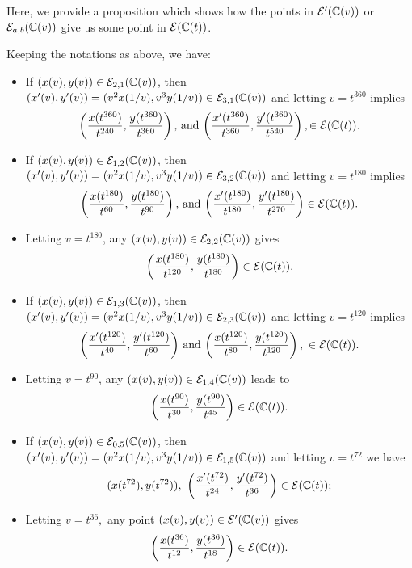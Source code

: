 \documentclass[11pt]{amsart}
\begin{document}
Here, we provide  a proposition which shows how the points  in ${\mathcal E}'({\mathbb C}(v))$ or ${\mathcal E}_{a, b}({\mathbb C}(v))$ give us some  point in ${\mathcal E} ({\mathbb C}(t))$. 
\begin{prop}
	\label{p1}
	Keeping the notations as above, we have:
	\begin{itemize}	
		\item [(1)] If $(x(v), y(v)) \in {\mathcal E}_{2, 1} ({\mathbb C}(v))$, then $ (x'(v), y'(v))=(v^2 x(1/v), v^3 y(1/v)) \in {\mathcal E}_{3, 1} ({\mathbb C}(v))$ and letting $v=t^{360}$ implies
		$$ \left(  \frac{x(t^{360})}{t^{240}},  \frac{y(t^{360})}{t^{360}}\right),\, \text{and}\,  
\left( \frac{x'(t^{360})}{t^{360}}, \frac{y'(t^{360})}{t^{540}} \right),
		\in {\mathcal E} ({\mathbb C}(t)).$$
		\item [(2)]  
		If $(x(v), y(v)) \in {\mathcal E}_{1, 2} ({\mathbb C}(v))$, then 
		$ (x'(v),y'(v))=(v^2 x(1/v), v^3 y(1/v)) \in {\mathcal E}_{3, 2} ({\mathbb C}(v))$ and letting $v=t^{180}$ implies  
		$$ 
		\left( \frac{x(t^{180})}{ t^{60}},  \frac{y(t^{180})}{t^{90}}\right), \, \text{and}\, 
		\left( \frac{x'(t^{180})}{ t^{180}}, \frac{y'(t^{180})}{t^{270}}\right) \in 
		{\mathcal E} ({\mathbb C}(t)).$$
	
	\item[(3)]	Letting $v=t^{180}$, any $(x(v), y(v)) \in {\mathcal E}_{2, 2} ({\mathbb C}(v))$ gives  
	$$\left(   \frac{x(t^{180})}{t^{120}},  \frac{y(t^{180})}{t^{180}}\right)  \in {\mathcal E} ({\mathbb C}(t)).$$
	
		\item [(4)] If $(x(v), y(v)) \in {\mathcal E}_{1, 3} ({\mathbb C}(v))$, then  
		$(x'(v),y'(v))=(v^2 x(1/v), v^3 y(1/v)) \in {\mathcal E}_{2, 3} ({\mathbb C}(v))$ and letting $v=t^{120}$ implies
		$$\left(  \frac{x'(t^{120})}{t^{40}} ,  \frac{y'(t^{120})}{t^{60}}\right) 
		\, \text{and}\, 
		\left(\frac{x(t^{120})}{t^{80}},  \frac{y(t^{120})}{t^{120}} \right), \ 
		\in \Ee (\CC(t)).$$
		\item [(5)]  Letting $v=t^{90}$, any $(x(v),y(v)) \in {\mathcal E}_{1, 4} ({\mathbb C}(v))$ leads to $$\left( \frac{x(t^{90})}{t^{30}}, \frac{y(t^{90})}{t^{45}}\right) \in {\mathcal E} ({\mathbb C}(t)).$$
		
		
		\item [(6)] If $(x(v),y(v)) \in {\mathcal E}_{0, 5} ({\mathbb C}(v))$, then $ (x'(v),y'(v))=(v^2 x(1/v), v^3 y(1/v)) \in {\mathcal E}_{1, 5} ({\mathbb C}(v))$ and letting $v=t^{72}$ we have 
		$$(x(t^{72}),y(t^{72})), \ 
		\left(\frac{x'(t^{72})}{ t^{24} } , \frac{y'(t^{72})}{ t^{36}}\right)	
		  \in \Ee (\CC(t));$$
		
		\item [(7)]  Letting $v=t^{36},$ any point $(x(v),y(v)) \in {\mathcal E}' ({\mathbb C}(v))$ gives
		$$\left(\frac{x(t^{36})}{ t^{12} },  \frac{y(t^{36})}{t^{18}} \right) \in {\mathcal E} ({\mathbb C}(t)).$$
		
		
		
	\end{itemize}
\end{prop}
\end{document}
